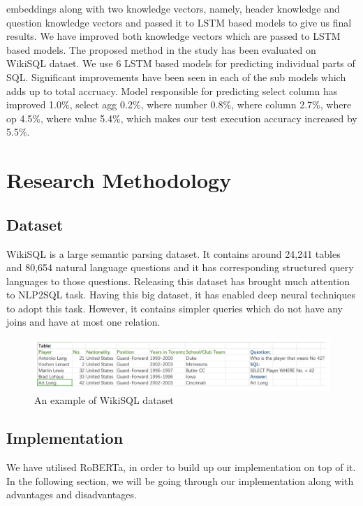 \documentclass[12pt]{article}
\begin{document}
embeddings along with two knowledge vectors, namely, header knowledge
and question knowledge vectors and passed it to LSTM based models to give
us final results. We have improved both knowledge vectors which are passed
to LSTM based models. The proposed method in the study has been evaluated on WikiSQL dataet. We use 6 LSTM based models for predicting
individual parts of SQL. Significant improvements have been seen in each
of the sub models which adds up to total accruacy. Model responsible for
predicting select column has improved 1.0\%, select agg 0.2\%, where number
0.8\%, where column 2.7\%, where op 4.5\%, where value 5.4\%, which makes
our test execution accuracy increased by 5.5\%.
 


\newpage




\section{Research Methodology}
\subsection{Dataset}
WikiSQL is a large semantic parsing dataset. It contains around 24,241 tables and 80,654 natural language questions and it has corresponding structured query languages to those questions. Releasing this dataset has brought much attention to NLP2SQL task. Having this big dataset, it has enabled deep neural techniques to adopt this task. However, it contains simpler queries which do not have any joins and have at most one relation. 
\begin{figure}[H]
    \includegraphics[width=450pt]{wikisql}
	\caption{An example of WikiSQL dataset}
    \label{fig:WikiSQL}
\end{figure}


\subsection{Implementation}
We have utilised RoBERTa, in order to build up our implementation on top of it. In the following section, we will be going through our implementation along with advantages and disadvantages. 
\end{document}
